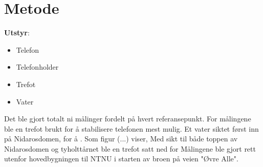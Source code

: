 \section{Metode}
\noindent\textbf{Utstyr}:
\begin{itemize}
    \item Telefon
    \item Telefonholder
    \item Trefot
    \item Vater
\end{itemize}

Det ble gjort totalt ni målinger fordelt på hvert referansepunkt.  
For målingene ble en trefot brukt for å stabilisere telefonen mest mulig. Et vater siktet først inn på Nidarosdomen, for å . Som figur (...) viser,  Med sikt til både toppen av Nidarosdomen og tyholttårnet ble en trefot satt ned for  
Målingene ble gjort rett utenfor hovedbygningen til NTNU i starten av broen på veien "Øvre Alle". 
